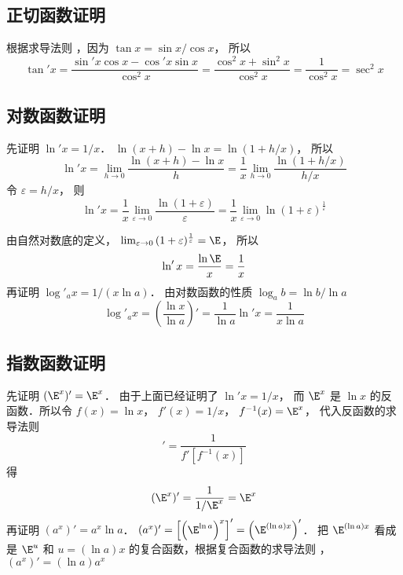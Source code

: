 \subsection{正切函数证明}
根据求导法则%
，因为 $\tan x = {{\sin x}}/{{\cos x}}$， 所以
\begin{equation}
\tan' x = \frac{\sin' x \cos x - \cos' x\sin x}{\cos^2 x} = \frac{\cos^2x + \sin^2 x}{\cos^2 x} = \frac{1}{\cos ^2 x} = \sec ^2 x
\end{equation}
\subsection{对数函数证明}
先证明 $\ln' x = {1}/{x}$．  $\ln(x + h) - \ln x = \ln(1 + h/x)$， 所以
 \begin{equation}
\ln 'x = \lim_{h \to 0} \frac{{\ln(x + h) - \ln x}}{h} = \frac{1}{x} \lim_{h \to 0} \frac{{\ln(1 + h/x)}}{{h/x}}
\end{equation}
令 $\varepsilon  = h/x$， 则
\begin{equation}
\ln' x = \frac{1}{x} \lim_{\varepsilon  \to 0} \frac{{\ln(1 + \varepsilon)}}{\varepsilon } = \frac{1}{x} \lim_{\varepsilon  \to 0} \ln(1 + \varepsilon)^{\frac{1}{\varepsilon }} 
\end{equation}
 
由自然对数底的定义， $\lim_{\varepsilon  \to 0} {(1 + \varepsilon)^{\frac{1}{\varepsilon }}} = \E$， 所以
 \begin{equation}
\ln 'x = \frac{{\ln \E}}{x} = \frac{1}{x}
\end{equation}
再证明 ${\log'_a}x = {1}/{(x\ln a)}$． 
由对数函数的性质 ${\log _a}b = {{\ln b}}/{{\ln a}}$
\begin{equation}
\log'_a x = \left( {\frac{{\ln x}}{{\ln a}}} \right)' = \frac{1}{\ln a}\ln' x = \frac{1}{x\ln a}
\end{equation}

\subsection{指数函数证明}
先证明 $(\E^x)' = \E^x$． 
由于上面已经证明了 $ \ln'x = 1/x$， 而 $\E^x$ 是 $\ln x$ 的反函数．所以令 $f(x) = \ln x$， $f'(x) = 1/x$，  $f^{ - 1} (x) = \E^x$， 代入反函数的求导法则%
\begin{equation}
[f^{-1} (x)]' = \frac{1}{f'[f^{ - 1}(x)]}
\end{equation} 
得
\begin{equation}
(\E^x)' = \frac{1}{{1/\E^x}} = \E^x
\end{equation}
再证明 $(a^x)' = a^x \ln a$．  $(a^x)' = \left[ \left( \E^{\ln a} \right)^x \right]' = \left( \E^{(\ln a) x} \right)'$． 把 $\E^{(\ln a) x}$ 看成是 $\E^u$ 和 $u = (\ln a) x$ 的复合函数，根据复合函数的求导法则 ，$(a^x)' = (\ln a) a^x$ 



















